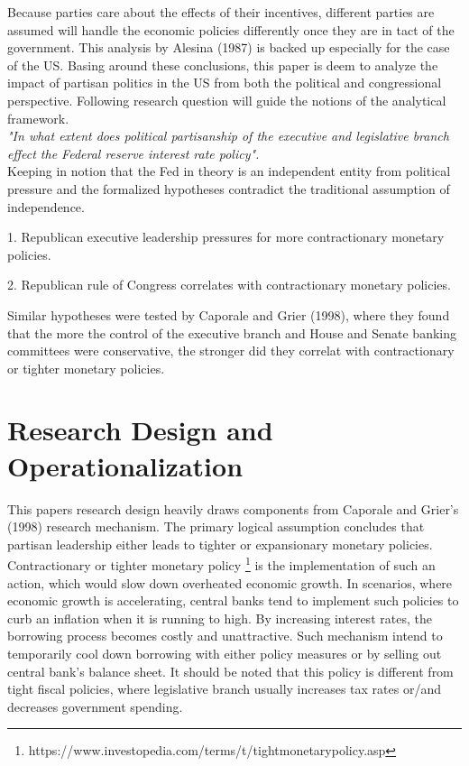 \documentclass[11pt]{article}
\begin{document}
Because parties care about the effects of their incentives, different parties are assumed will handle the economic policies differently once they are in tact of the government. This analysis by Alesina (1987) is backed up especially for the case of the US. Basing around these conclusions, this paper is deem to analyze the impact of partisan politics in the US from both the political and congressional perspective. Following research question will guide the notions of the analytical framework.
\\

\textit {"In what extent does political partisanship of the executive and legislative branch effect the Federal reserve interest rate policy".}
\\

Keeping in notion that the Fed in theory is an independent entity from political pressure and the formalized hypotheses contradict the traditional assumption of independence.

1. Republican executive leadership pressures for more contractionary monetary policies.\

2. Republican rule of Congress correlates with contractionary monetary policies.

Similar hypotheses were tested by Caporale and Grier (1998), where they found that the more the control of the executive branch and House and Senate banking committees were conservative, the stronger did they correlat with contractionary or tighter monetary policies.

\section{Research Design and Operationalization}

This papers research design heavily draws components from Caporale and Grier's (1998) research mechanism. The primary logical assumption concludes that partisan leadership either leads to tighter or expansionary monetary policies. Contractionary or tighter monetary policy \footnote{https://www.investopedia.com/terms/t/tightmonetarypolicy.asp} is the implementation of such an action, which would slow down overheated economic growth. In scenarios, where economic growth is accelerating, central banks tend to implement such policies to curb an inflation when it is running to high. By increasing interest rates, the borrowing process becomes costly and unattractive. Such mechanism intend to temporarily cool down borrowing with either policy measures or by selling out central bank's balance sheet. It should be noted that this policy is different from tight fiscal policies, where legislative branch usually increases tax rates or/and decreases government spending. \
\end{document}
